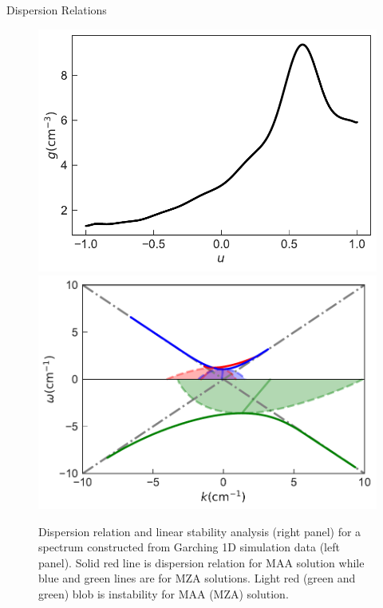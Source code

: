 \documentclass[9pt]{beamer}
\begin{document}
\begin{darkframes}
\begin{frame}{Dispersion Relations}
   \begin{figure}
        \includegraphics[width=\linewidth]{assets/dr/spectGarchingPlt.pdf}
      \endminipage\hfill
      \includegraphics[width=\linewidth]{assets/dr/spectGarchingDRLSAPltBlob.pdf}
      \endminipage\hfill
      \caption*{Dispersion relation and linear stability analysis (right panel) for a spectrum constructed from Garching 1D simulation data (left panel). Solid red line is dispersion relation for MAA solution while blue and green lines are for MZA solutions. Light red (green and green) blob is instability for MAA (MZA) solution.
       }
   \end{figure}


\end{frame}


\end{darkframes}
\end{document}
